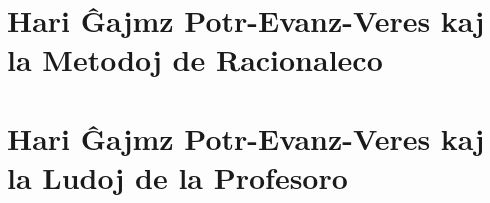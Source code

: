 \RequirePackage[pdf]{layout/hp-book}








\newcommand{\writtenNoteA}[1]{\par\textcolor{writtenNote}{#1}}
\renewcommand{\parsel}[1]{\textcolor{parsel}{#1}}
\renewcommand{\McGonagallWhiteBoard}[1]{\textcolor{McGonagallWhiteBoard}{\par#1}}
\renewcommand{\headline}[1]{\begin{center}\textcolor{headline}{#1}\end{center}}
\renewcommand{\inlineheadline}[1]{\textcolor{headline}{#1}}
\renewcommand{\newspaperHeader}[1]{#1}
\renewcommand{\hplettrineextrapara}[0]{}


\part{Hari Ĝajmz Potr-Evanz-Veres kaj la Metodoj de Racionaleco}

% 
% 
% 
% 
% 
% 
% 
% 
% 
% 
% 
% 
% 
% 
% 
% 
% 
% 
% 
\part{Hari Ĝajmz Potr-Evanz-Veres kaj la Ludoj de la Profesoro}
% 
% 
% 
% 
% 
% 
% 
% 
% 
% 
% 
% 
% 
% 
% 
% 
